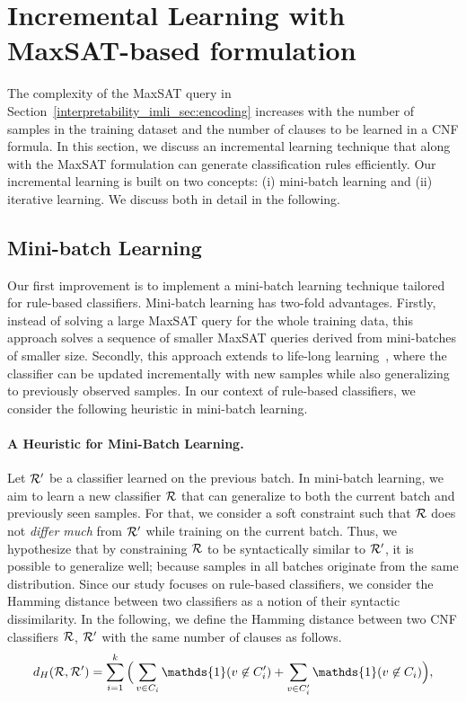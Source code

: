 \section{Incremental Learning with MaxSAT-based formulation}
\label{interpretability_imli_sec:incremental_learning}
The complexity of the MaxSAT query in Section~\ref{interpretability_imli_sec:encoding} increases with the number of samples in the training dataset and the number of clauses to be learned in a CNF formula. In this section, we discuss an incremental learning technique that along with the MaxSAT formulation can generate classification rules efficiently. Our incremental learning is built on two concepts: (i)
mini-batch learning and (ii) iterative learning. We discuss both in detail in the following.

\subsection{Mini-batch Learning} 

Our first improvement is to implement a mini-batch learning technique tailored for rule-based classifiers. Mini-batch learning has two-fold advantages. Firstly, instead of solving a large MaxSAT query for the whole training data, this approach solves a sequence of smaller MaxSAT queries derived from mini-batches of smaller size.  Secondly, this approach extends to life-long learning~\cite{chen2018lifelong}, where the classifier can be updated incrementally with new samples while also generalizing to previously observed samples. In our context of rule-based classifiers, we consider the following heuristic in mini-batch learning.


\paragraph{A Heuristic for Mini-Batch Learning.} Let $ {\mathcal{R}}' $ be a classifier learned on the previous batch. In mini-batch learning, we aim to learn a new classifier $ {\mathcal{R}} $ that can generalize to both the current batch and previously seen samples. For that, we consider a soft constraint such that $ {\mathcal{R}} $ does not \emph{differ much} from $ {\mathcal{R}}' $ while training on the current batch. Thus, we hypothesize that by constraining $ {\mathcal{R}} $ to be syntactically similar to $ {\mathcal{R}}' $, it is possible to generalize well; because samples in all batches originate from the same distribution. Since our study focuses on rule-based classifiers, we consider the Hamming distance between two classifiers as a notion of their syntactic dissimilarity. In the following, we define the Hamming distance between two CNF classifiers $ {\mathcal{R}} $, $ {\mathcal{R}}' $ with the same number of clauses as follows.
\[
	d_{H}(\Rule, \Rule') = \sum_{i=1}^k \Big(\sum_{v\in C_i} \mathds{1}(v \not\in C'_i) +  \sum_{v\in C'_i} \mathds{1}(v \not\in C_i) \Big), 
\]
 
